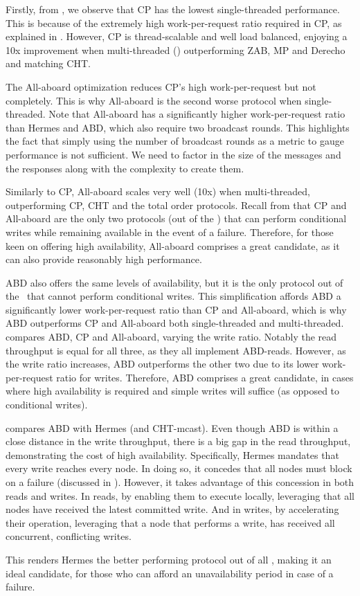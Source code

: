 

Firstly, from , we observe that CP has the lowest single-threaded performance. This is because of the extremely high work-per-request ratio required in CP, as explained in . However,  CP is thread-scalable and well load balanced, enjoying a 10x improvement when multi-threaded () outperforming ZAB, MP and Derecho and matching CHT.

The All-aboard optimization reduces CP's high work-per-request but not completely.
This is why All-aboard is the second worse protocol when single-threaded.
Note that All-aboard has a significantly higher work-per-request ratio than Hermes and ABD, which also require two broadcast rounds. 
This highlights the fact that simply using the number of broadcast rounds as a metric to gauge performance is not sufficient. We need to factor in the size of the messages and the responses along with the complexity to create them.


Similarly to CP, All-aboard scales very well (10x) when multi-threaded, outperforming CP, CHT and the total order protocols.
Recall from  that CP and All-aboard are the only two protocols (out of the \pnum) that can perform conditional writes while remaining available in the event of a failure. Therefore, for those keen on offering high availability, All-aboard comprises a great candidate, as it can also provide reasonably high performance.


ABD also offers the same levels of availability, but it is the only protocol out of the \pnum~that cannot perform conditional writes.
This simplification affords ABD a significantly lower work-per-request ratio than CP and All-aboard, which is why ABD outperforms CP and All-aboard both single-threaded and multi-threaded.
 compares ABD, CP and All-aboard, varying the write ratio. Notably the read throughput is equal for all three, as they all implement ABD-reads. However, as the write ratio increases, ABD outperforms the other two due to its lower work-per-request ratio for writes.
Therefore, ABD comprises a great candidate, in cases where high availability is required and simple writes will suffice (as opposed to conditional writes).

 compares ABD with Hermes (and CHT-mcast). Even though ABD is within a close distance in the write throughput, there is a big gap in the read throughput, demonstrating the cost of high availability. Specifically, Hermes mandates that every write reaches every node. In doing so, it concedes that all nodes must block on a failure (discussed in ). However, it takes advantage of this concession in both reads and writes. In reads, by enabling them to execute locally, leveraging that all nodes have received the latest committed write. And in writes, by accelerating their operation, leveraging that a node that performs a write, has received all concurrent, conflicting writes.

This renders Hermes the better performing protocol out of all \pnum, making it an ideal candidate, for those who can afford an unavailability period in case of a failure.







